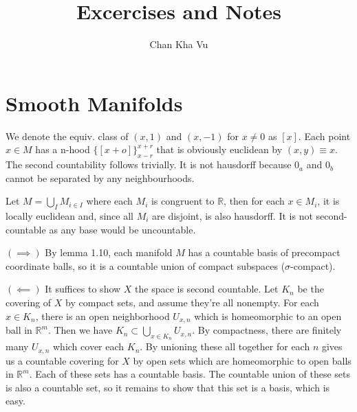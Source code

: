 \documentclass[a4paper]{article}
\title{Excercises and Notes}
\author{Chan Kha Vu}
\date{}
\begin{document}
\maketitle

\section{Smooth Manifolds}
\bigskip

\begin{exercise}[1-1]
    We denote the equiv. class of $(x, 1)$ and $(x, -1)$ for $x \ne 0$ as $[x]$.
    Each point $x \in M$ has a n-hood $\{ [x+o] \}_{x-r}^{x+r}$ that is
    obviously euclidean by $(x, y) \equiv x$. The second countability follows trivially.
    It is not hausdorff because $0_a$ and $0_b$ cannot be separated by any
    neighbourhoods.
\end{exercise}

\begin{exercise}[1-2]
    Let $M = \bigcup_I M_{i\in I}$ where each $M_i$ is congruent to $\mathbb{R}$,
    then for each $x \in M_i$, it is locally euclidean and, since all $M_i$
    are disjoint, is also hausdorff. It is not second-countable as any base
    would be uncountable.
\end{exercise}

\begin{exercise}[1-3]
    $(\implies)$ By lemma 1.10, each manifold $M$ has a countable basis of precompact
    coordinate balls, so it is a countable union of compact subspaces
    ($\sigma$-compact).

    $( \impliedby )$ It suffices to show $X$ the space is second countable.
    Let $K_n$ be the covering of $X$ by compact sets, and assume they're
    all nonempty. For each $x\in K_n$, there is an open neighborhood
    $U_{x,n}$ which is homeomorphic to an open ball in $\mathbb{R}^m$.
    Then we have $K_n\subset \bigcup_{x\in K_n} U_{x,n}$. By compactness,
    there are finitely many $U_{x,n}$ which cover each $K_n$. By unioning these
    all together for each $n$ gives us a countable covering for $X$ by open sets
    which are homeomorphic to open balls in $\mathbb{R}^m$. Each of these sets
    has a countable basis. The countable union of these sets is also a countable
    set, so it remains to show that this set is a basis, which is easy.
\end{exercise}
\end{document}
